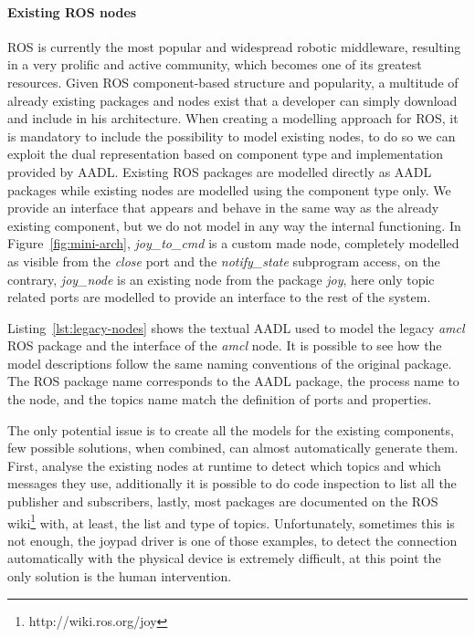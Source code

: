\paragraph{Existing ROS nodes} ROS is currently the most popular and widespread robotic middleware, resulting in a very prolific and active community, which becomes one of its greatest resources. Given ROS component-based structure and popularity,  a multitude of already existing packages and nodes exist that a developer can simply download and include in his architecture. When creating a modelling approach for ROS, it is mandatory to include the possibility to model existing nodes, to do so we can exploit the dual representation based on component type and implementation provided by AADL.  Existing ROS packages are modelled directly as AADL packages while existing nodes are modelled using the component type only. We provide an interface that appears and behave in the same way as the already existing component, but we do not model in any way the internal functioning. In Figure~\ref{fig:mini-arch}, \textit{joy\_to\_cmd} is a custom made node, completely modelled as visible from the \textit{close} port and the \textit{notify\_state} subprogram access, on the contrary, \textit{joy\_node} is an existing node from the package \textit{joy}, here only topic related ports are modelled to provide an interface to the rest of the system. 

Listing~\ref{lst:legacy-nodes} shows the textual AADL used to model the legacy \textit{amcl} ROS package and the interface of the \textit{amcl} node. It is possible to see how the model descriptions follow the same naming conventions of the original package. The ROS package name corresponds to the AADL package, the process name to the node, and the topics name match the definition of ports and properties.

The only potential issue is to create all the models for the existing components, few possible solutions, when combined, can almost automatically generate them. First, analyse the existing nodes at runtime to detect which topics and which messages they use, additionally it is possible to do code inspection to list all the publisher and subscribers, lastly, most packages are documented on the ROS wiki\footnote{http://wiki.ros.org/joy} with, at least, the list and type of topics. Unfortunately, sometimes this is not enough, the joypad driver is one of those examples, to detect the connection automatically with the physical device is extremely difficult, at this point the only solution is the human intervention.

